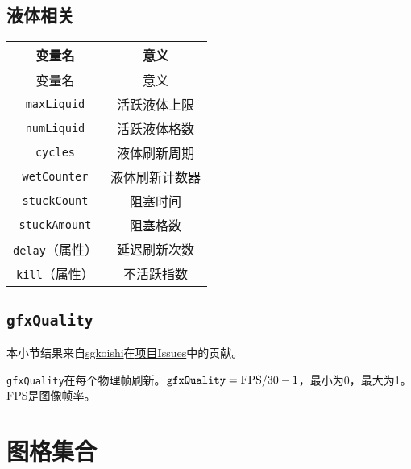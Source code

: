 \subsection{液体相关}
\begin{longtable}{|c|c|}
\hline \label{tab10}变量名&意义\\\hline
\endfirsthead
变量名&意义\\\hline
\endhead
\hline
\endfoot
{\lstinline!maxLiquid!}&活跃液体上限\\\hline
{\lstinline!numLiquid!}&活跃液体格数\\\hline
{\lstinline!cycles!}&液体刷新周期\\\hline
{\lstinline!wetCounter!}&液体刷新计数器\\\hline
{\lstinline!stuckCount!}&阻塞时间\\\hline
{\lstinline!stuckAmount!}&阻塞格数\\\hline
{\lstinline!delay!}（属性）&延迟刷新次数\\\hline
{\lstinline!kill!}（属性）&不活跃指数\\
\end{longtable}

\subsection{\lstinline{gfxQuality}}\label{app34}
\begin{note}
本小节结果来自\href{https://github.com/sgkoishi}{sgkoishi}在\href{https://github.com/putianyi889/TerrariaWiringTutorial/issues/11#issuecomment-544567689}{项目Issues}中的贡献。
\end{note}
\lstinline{gfxQuality}在每个物理帧刷新。$\mathtt{gfxQuality}=\textnormal{FPS}/30-1$，最小为0，最大为1。FPS是图像帧率。

\section{图格集合}
